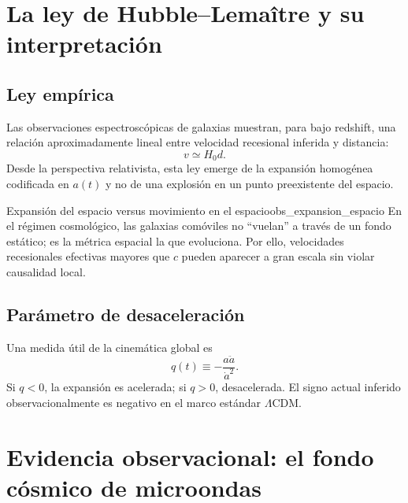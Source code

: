 \section{La ley de Hubble--Lemaître y su interpretación}
\label{sec:hubble_lemaitre}

\subsection{Ley empírica}

Las observaciones espectroscópicas de galaxias muestran, para bajo redshift, una relación aproximadamente lineal entre velocidad recesional inferida y distancia:
\begin{equation}
  v \simeq H_0 d.
  \label{eq:hubble_law}
\end{equation}
Desde la perspectiva relativista, esta ley emerge de la expansión homogénea codificada en $a(t)$ y no de una explosión en un punto preexistente del espacio.

\begin{observacion}{Expansión del espacio versus movimiento en el espacio}{obs_expansion_espacio}
En el régimen cosmológico, las galaxias comóviles no ``vuelan'' a través de un fondo estático; es la métrica espacial la que evoluciona. Por ello, velocidades recesionales efectivas mayores que $c$ pueden aparecer a gran escala sin violar causalidad local.
\end{observacion}

\subsection{Parámetro de desaceleración}

Una medida útil de la cinemática global es
\begin{equation}
  q(t) \equiv -\frac{a\ddot a}{\dot a^2}.
\end{equation}
Si $q<0$, la expansión es acelerada; si $q>0$, desacelerada. El signo actual inferido observacionalmente es negativo en el marco estándar $\Lambda$CDM.

\section{Evidencia observacional: el fondo cósmico de microondas}
\label{sec:cmb_evidencia}

